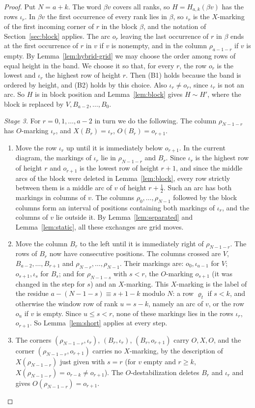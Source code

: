 \documentclass[11pt]{amsart}
\theoremstyle{definition}
\theoremstyle{remark}
\newcommand{\Mov}{\mathrel{\sim}}
\begin{document}
\begin{proof}
Put $N=a+k$. The word $\beta v$ covers all ranks, so $H=H_{a,k}(\beta v)$ has the rows $\iota_r$. In
$\beta v$ the first occurrence of every rank lies in $\beta$, so $\iota_r$ is the $X$-marking of the
first incoming corner of $r$ in the block $\beta$, and the notation of Section~\ref{sec:block}
applies. The arc $o_r$ leaving the last occurrence of $r$ in $\beta$ ends at the first occurrence of
$r$ in $v$ if $v$ is nonempty, and in the column $\rho_{a-1-r}$ if $v$ is empty. By
Lemma~\ref{lem:hybrid-grid} we may choose the order among rows of equal height in the band. We
choose it so that, for every $r$, the row $o_r$ is the lowest and $\iota_r$ the highest row of height
$r$. Then (B1) holds because the band is ordered by height, and (B2) holds by this choice. Also
$\iota_r\ne o_r$, since $\iota_r$ is not an arc. So $H$ is in block position and
Lemma~\ref{lem:block} gives $H\Mov H'$, where the block is replaced by $V,B_{a-2},\dots,B_0$.

\emph{Stage 3.} For $r=0,1,\dots,a-2$ in turn we do the following. The column $\rho_{N-1-r}$ has
$O$-marking $\iota_r$, and $X(B_r)=\iota_r$, $O(B_r)=o_{r+1}$.
\begin{enumerate}
\item Move the row $\iota_r$ up until it is immediately below $o_{r+1}$. In the current diagram,
the markings of $\iota_r$ lie in $\rho_{N-1-r}$ and $B_r$. Since $\iota_r$ is the highest row of height
$r$ and $o_{r+1}$ is the lowest row of height $r+1$, and since the middle arcs of the block were
deleted in Lemma~\ref{lem:block}, every row strictly between them is a middle arc of $v$ of height
$r+\frac12$. Such an arc has both markings in columns of $v$. The columns $\rho_0,\dots,\rho_{N-1}$
followed by the block columns form an interval of positions containing both markings of
$\iota_r$, and the columns of $v$ lie outside it. By Lemma~\ref{lem:separated} and
Lemma~\ref{lem:static}, all these exchanges are grid moves.
\item Move the column $B_r$ to the left until it is immediately right of $\rho_{N-1-r}$. The rows of
$B_r$ now have consecutive positions. The columns crossed are $V$, $B_{a-2},\dots,B_{r+1}$ and
$\rho_{N-r},\dots,\rho_{N-1}$. Their markings are: $o_0,\iota_{a-1}$ for $V$; $o_{s+1},\iota_s$ for
$B_s$; and for $\rho_{N-1-s}$ with $s<r$, the $O$-marking $o_{s+1}$ (it was changed in the step for
$s$) and an $X$-marking. This $X$-marking is the label of the residue $a-(N-1-s)\equiv s+1-k$
modulo $N$: a row $\varrho_t$ if $s<k$, and otherwise the window row of rank $u=s-k$, namely an arc
of $v$, or the row $o_u$ if $v$ is empty. Since $u\le s<r$, none of these markings lies in the rows
$\iota_r$, $o_{r+1}$. So Lemma~\ref{lem:short} applies at every step.
\item The corners $(\rho_{N-1-r},\iota_r)$, $(B_r,\iota_r)$, $(B_r,o_{r+1})$ carry $O,X,O$, and the
corner $(\rho_{N-1-r},o_{r+1})$ carries no $X$-marking, by the description of $X(\rho_{N-1-r})$ just
given with $s=r$ (for $v$ empty and $r\ge k$, $X(\rho_{N-1-r})=o_{r-k}\ne o_{r+1}$). The
$O$-destabilization deletes $B_r$ and $\iota_r$ and gives $O(\rho_{N-1-r})=o_{r+1}$.
\end{enumerate}


\end{proof}
\end{document}
